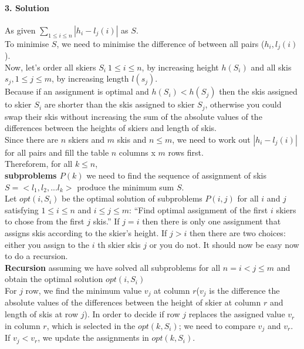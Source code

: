 \documentclass[a4paper]{scrartcl}
\begin{document}
\paragraph{3. Solution}
\label{sec:Question3}
As given $\sum_{1\leq i \leq n} | h_i - l_j(i) | $ as $S$.\\
To minimise $S$, we need to minimise the difference of between all pairs ($h_i, l_j(i)$).\\
Now, let's order all skiers $S_i\ 1\leq i \leq n$, by increasing height $h(S_i)$ and all skis $s_j, 1\leq j \leq m$, by increasing length $l(s_j)$. \\
Because if an assignment is optimal and $h(S_i) < h(S_j)$ then the skis assigned to skier $S_i$ are shorter than the skis assigned to skier $S_j$, otherwise you could swap their skis without increasing the sum of the absolute values of the differences between the heights of skiers and length of skis.\\
Since there are $n$ skiers and $m$ skis and $n\leq m$, we need to work out $|h_i-l_j(i)|$ for all pairs and fill the table $n$ columns x $m$ rows first. \\
Thereforem, for all $k \leq n$,\\
\textbf{subproblems $P(k)$} we need to find the sequence of assignment of skis $S=\big<l_1,l_2,...l_k\big>$ produce the minimum sum $S$.\\
Let $opt(i,S_{i})$ be the optimal solution of subproblems $P(i, j)$ for all $i$ and $j$ satisfying $1 \leq i \leq n$ and $i \leq j \leq m$: “Find optimal assignment of the first $i$ skiers to chose from the first $j$ skis.” If $j = i$ then there is only one assignment that assigns skis according to the skier’s height. If $j > i$ then there are two choices: either you assign to the $i$ th skier skis $j$ or you do not. It should now be easy now to do a recursion.\\
\textbf{Recursion} assuming we have solved all subproblems for all $ n = i < j \leq m$ and obtain the optimal solution $opt(i,S_{i})$\\
For $j$ row, we find the minimum value $v_j$ at column $r$($v_j$ is the difference the absolute values of the differences between the height of skier at column $r$ and length of skis at row $j$). In order to decide if row $j$ replaces the assigned value $v_r$ in column $r$, which is selected in the $opt(k,S_{i})$; we need to compare $v_j$ and $v_r$. If $v_j < v_r$, we update the assignments in $opt(k,S_{i})$.
\end{document}
